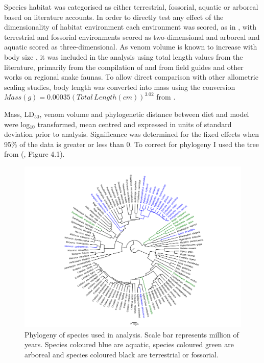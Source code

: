 Species habitat was categorised as either terrestrial, fossorial, aquatic or arboreal based on literature accounts. In order to directly test any effect of the dimensionality of habitat environment each environment was scored, as in \cite{pawar2012dimensionality}, with terrestrial and fossorial environments scored as two-dimensional and arboreal and aquatic scored as three-dimensional.
As venom volume is known to increase with body size \citep{mirtschin2002influences}, it was included in the analysis using total length values from the literature, primarily from the compilation of \citep{boback2003empirical} and from field guides and other works on regional snake faunas. To allow direct comparison with other allometric scaling studies, body length was converted into mass using the conversion $Mass (g) = 0.00035({Total\,Length(cm)})^{3.02}$ from \cite{pough1980advantages}.


Mass, LD$_{50}$, venom volume and phylogenetic distance between diet and model were log$_{10}$ transformed, mean centred and expressed in units of standard deviation prior to analysis. Significance was determined for the fixed effects when 95\% of the data is greater or less than 0. To correct for phylogeny I used the tree from (\cite{pyron2014early}, Figure 4.1). 


\begin{figure}[h]
  \centering
  \includegraphics[width=.95\textwidth]{ch4-snakes/fig1_snake_phylo.pdf}%
  \caption[ ]{Phylogeny of species used in analysis. Scale bar represents million of years. Species coloured blue are aquatic, species coloured green are arboreal and species coloured black are terrestrial or fossorial.}
  \label{fig:Figure 4.1.}
\end{figure}


